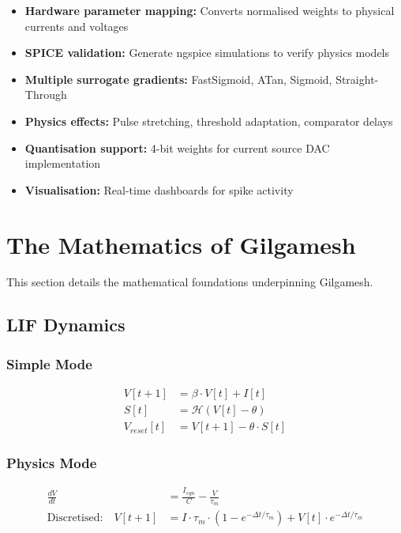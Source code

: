 \documentclass[11pt,a4paper]{article}
\begin{document}
\begin{itemize}
    \item \textbf{Hardware parameter mapping:} Converts normalised weights to physical currents and voltages
    \item \textbf{SPICE validation:} Generate ngspice simulations to verify physics models
    \item \textbf{Multiple surrogate gradients:} FastSigmoid, ATan, Sigmoid, Straight-Through
    \item \textbf{Physics effects:} Pulse stretching, threshold adaptation, comparator delays
    \item \textbf{Quantisation support:} 4-bit weights for current source DAC implementation
    \item \textbf{Visualisation:} Real-time dashboards for spike activity
\end{itemize}

\section{The Mathematics of Gilgamesh}

This section details the mathematical foundations underpinning Gilgamesh.

\subsection{LIF Dynamics}

\subsubsection{Simple Mode}
\begin{align}
    V[t+1] &= \beta \cdot V[t] + I[t] \\
    S[t] &= \mathcal{H}(V[t] - \theta) \\
    V_{reset}[t] &= V[t+1] - \theta \cdot S[t]
\end{align}

\subsubsection{Physics Mode}
\begin{align}
    \frac{dV}{dt} &= \frac{I_{syn}}{C} - \frac{V}{\tau_m} \\
    \text{Discretised:} \quad V[t+1] &= I \cdot \tau_m \cdot (1 - e^{-\Delta t/\tau_m}) + V[t] \cdot e^{-\Delta t/\tau_m}
\end{align}
\end{document}
